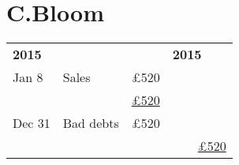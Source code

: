

\section*{C.Bloom}
\noindent
\begin{tabular}{@{}p{2cm}p{4cm}r|p{2cm}p{4cm}r@{}}
\toprule
\multicolumn{3}{l|}{\textbf{2015}} & \multicolumn{3}{l}{\textbf{2015}} \\
Jan 8 & Sales & £520 \\
& & \underline{£520} 
& & & \\
Dec 31 & Bad debts & £520 \\
& & & & & \underline{£520} \\
\end{tabular}

\vspace{1.5cm}

